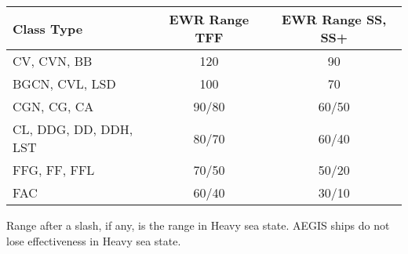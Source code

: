 
\begin{twocolumntablefloat}
\begin{twocolumntable}
\begin{tabularx}{0.7\linewidth}{lCC}
\toprule
Class Type&EWR Range TFF&EWR Range SS, SS+\\
\midrule
CV, CVN, BB	          &120	 &90\\
BGCN, CVL, LSD	      &100	 &70\\
CGN, CG, CA           &90/80 &60/50\\
CL, DDG, DD, DDH, LST &80/70 &60/40\\
FFG, FF, FFL	      &70/50 &50/20\\
FAC                   &60/40 &30/10\\
\bottomrule
\end{tabularx}
\end{twocolumntable}

\medskip

\begin{tablenote}{0.7\linewidth}
Range after a slash, if any, is the range in Heavy sea state. AEGIS ships do not lose effectiveness in Heavy sea state.
\end{tablenote}
\end{twocolumntablefloat}